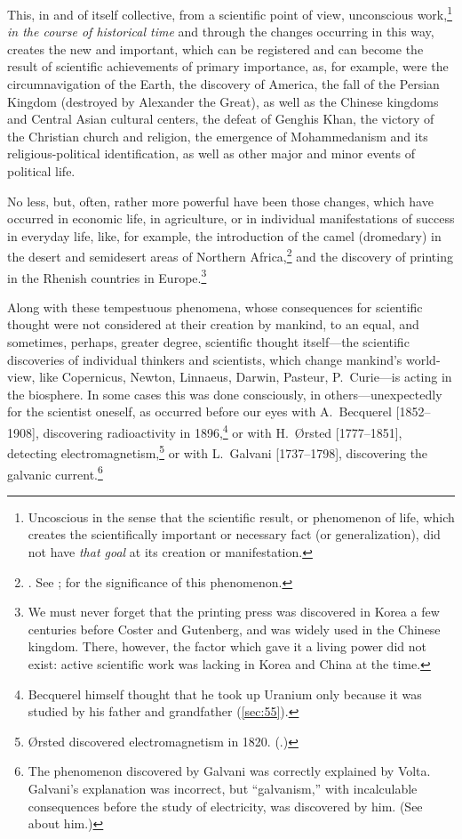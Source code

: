 This, in and of itself collective,  from a scientific point
of view, unconscious work,\footnote{%
	Uncoscious in the sense that the scientific result, or phenomenon of
	life, which creates the scientifically important or necessary fact (or
	generalization), did not have \emph{that goal} at its creation or
	manifestation.
} \emph{in the course of historical time} and through the
changes occurring in this way, creates the new and important, which can be
registered and can become the result of scientific achievements of primary
importance, as, for example, were the circumnavigation of the Earth, the
discovery of America, the fall of the Persian Kingdom (destroyed by Alexander
the Great), as well as the Chinese kingdoms and Central Asian cultural centers,
the defeat of Genghis Khan, the victory of the Christian church and religion,
the emergence of Mohammedanism and its religious-political identification, as
well as other major and minor events of political life.

No less, but, often, rather more powerful have been those changes, which have
occurred in economic life, in agriculture, or in individual manifestations of
success in everyday life, like, for example, the introduction of the camel
(dromedary) in the desert and semidesert areas of Northern Africa,\footnote{%
	\cite[p.~178]{julien1931histoire}.  See
	\cite{gsell1926memoires}; \cite[p.~181]{gautier1927siecles} for the significance of this
	phenomenon.
} and the discovery of printing in the Rhenish countries in Europe.\footnote{%
	We must never forget that the printing press was discovered in Korea a
	few centuries before Coster and Gutenberg, and was widely used in the
	Chinese kingdom.  There, however, the factor which gave it a living
	power did not exist: active scientific work was lacking in Korea and
	China at the time.
}

Along with these tempestuous phenomena, whose consequences for scientific
thought were not considered at their creation by mankind, to an equal, and
sometimes, perhaps, greater degree, scientific thought itself---the scientific
discoveries of individual thinkers and scientists, which change mankind's
world-view, like Copernicus, Newton, Linnaeus, Darwin, Pasteur, P.\ Curie---is
acting in the biosphere.  In some cases this was done consciously, in
others---unexpectedly for the scientist oneself, as occurred before our
eyes with A.\ Becquerel [1852--1908], discovering radioactivity in
1896,\footnote{%
	Becquerel himself thought that he took up Uranium only because it was
	studied by his father and grandfather (\autoref{sec:55}).
} or with H.\ Ørsted [1777--1851], detecting electromagnetism,\footnote{%
	Ørsted discovered electromagnetism in 1820.
	(\cite{oersted1920discovery}.)
} or with L.\ Galvani [1737--1798], discovering the galvanic
current.\footnote{%
	The phenomenon discovered by Galvani was correctly explained by Volta.
	Galvani's explanation was incorrect, but ``galvanism,'' with
	incalculable consequences before the study of electricity, was
	discovered by him.  (See \cite{alibert1801eloge} about him.)
}

